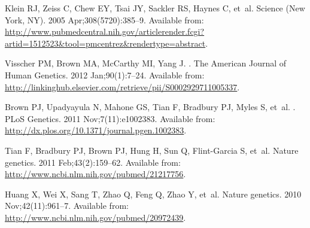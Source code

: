 \documentclass[10pt,letterpaper]{article}
\providecommand{\DIFaddbegin}{} %
\providecommand{\DIFaddend}{} %
\providecommand{\DIFdelbegin}{} %
\providecommand{\DIFdelend}{} %
\begin{document}
\DIFaddbegin \begin{thebibliography}{}
\DIFaddend %
%
%
% 


\DIFdelbegin %
\DIFdelend %

Klein RJ, Zeiss C, Chew EY, Tsai JY, Sackler RS, Haynes C, et~al.
\newblock Science (New York, NY). 2005 Apr;308(5720):385--9.
\newblock Available from:
  \url{http://www.pubmedcentral.nih.gov/articlerender.fcgi?artid=1512523\&tool=pmcentrez\&rendertype=abstract}.

Visscher PM, Brown MA, McCarthy MI, Yang J.
.
\newblock The American Journal of Human Genetics. 2012 Jan;90(1):7--24.
\newblock Available from:
  \url{http://linkinghub.elsevier.com/retrieve/pii/S0002929711005337}.

Brown PJ, Upadyayula N, Mahone GS, Tian F, Bradbury PJ, Myles S, et~al.
.
\newblock PLoS Genetics. 2011 Nov;7(11):e1002383.
\newblock Available from:
  \url{http://dx.plos.org/10.1371/journal.pgen.1002383}.

Tian F, Bradbury PJ, Brown PJ, Hung H, Sun Q, Flint-Garcia S, et~al.
\newblock Nature genetics. 2011 Feb;43(2):159--62.
\newblock Available from: \url{http://www.ncbi.nlm.nih.gov/pubmed/21217756}.

Huang X, Wei X, Sang T, Zhao Q, Feng Q, Zhao Y, et~al.
\newblock Nature genetics. 2010 Nov;42(11):961--7.
\newblock Available from: \url{http://www.ncbi.nlm.nih.gov/pubmed/20972439}.


\end{thebibliography}
\end{document}
